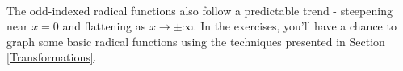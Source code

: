 \documentclass[12pt]{ximera}
\begin{document}
\[ \begin{array}{ccc}






&







&










\end{array}\]

The odd-indexed radical functions also follow a predictable trend - steepening near $x = 0$ and flattening as $x \rightarrow \pm \infty$.  In the exercises, you'll have a chance to graph some basic radical functions using the techniques presented in Section \ref{Transformations}.
\end{document}
